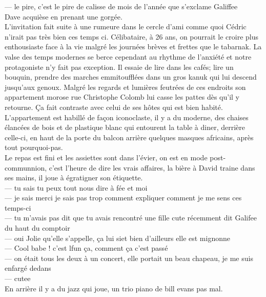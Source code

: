 \documentclass{article}
\begin{document}
--- le pire, c'est le pire de calisse de mois de l'année que s'exclame Galiffee\\
Dave acquièse en prenant une gorgée.\\

L'invitation fait suite à une rumeure dans le cercle d'ami comme quoi Cédric n'irait pas
très bien ces temps ci. Célibataire, à 26 ans, on pourrait le croire plus enthousiaste face
à la vie malgré les journées brèves et frettes que le tabarnak. La valse des temps modernes
se berce cependant au rhythme de l'anxiété et notre protagoniste n'y fait pas exception.
Il essaie de lire dans les cafés; lire un bouquin, prendre des marches emmitoufflées
dans un gros kanuk qui lui descend jusqu'aux genoux. Malgré les regards et lumières
feutrées de ces endroits son appartement morose rue Christophe Colomb lui casse les pattes
dès qu'il y retourne. Ça fait contraste avec celui de ses hôtes qui est bien habité.
L'appartement est habillé de façon iconoclaste, il y a du moderne, des chaises élancées
de bois et de plastique blanc qui entourent la table à diner, derrière celle-ci, en haut
de la porte du balcon arrière quelques masques africains, après tout pourquoi-pas.\\

Le repas est fini et les assiettes sont dans l'évier, on est en mode post-communnion,
c'est l'heure de dire les vrais affaires, la bière à David traine dans ses mains, il
joue à égratigner son étiquette.\\

--- tu sais tu peux tout nous dire à fée et moi \\
--- je sais merci je sais pas trop comment expliquer comment je me sens ces temps-ci\\
--- tu m'avais pas dit que tu avais rencontré une fille cute récemment dit Galifee du
haut du comptoir\\
--- oui Jolie qu'elle s'appelle, ça lui siet bien d'ailleurs elle est mignonne\\
--- Cool babe ! c'est lfun ça, comment ça c'est passé\\
--- on était tous les deux à un concert, elle portait un beau chapeau, je me suis enfargé dedans\\
--- cutee\\

En arrière il y a du jazz qui joue, un trio piano de bill evans pas mal.\\

\clearpage
\end{document}
